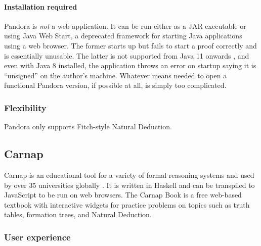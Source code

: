 \paragraph{Installation required}
Pandora is \textit{not} a web application. It can be run either as a JAR executable or using Java Web Start, a deprecated framework for starting Java applications using a web browser. The former starts up but fails to start a proof correctly and is essentially unusable. The latter is not supported from Java 11 onwards \cite{oracle:2020}, and even with Java 8 installed, the application throws an error on startup saying it is ``unsigned'' on the author's machine. Whatever means needed to open a functional Pandora version, if possible at all, is simply too complicated.

\subsubsection{Flexibility}
Pandora only supports Fitch-style Natural Deduction.

\subsection{Carnap}
Carnap \cite{carnap, carnap:2018} is an educational tool for a variety of formal reasoning systems and used by over 35 universities globally \cite{carnap:about}. It is written in Haskell and can be transpiled to JavaScript to be run on web browsers. The Carnap Book \cite{carnap:book} is a free web-based textbook with interactive widgets for practice problems on topics such as truth tables, formation trees, and Natural Deduction.

\subsubsection{User experience}

